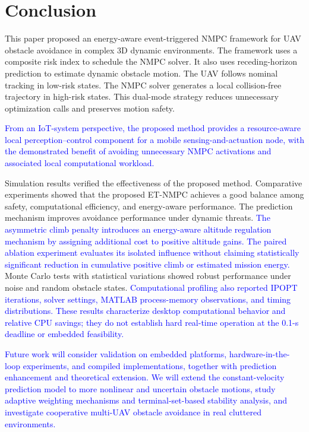 \documentclass[lettersize,journal]{IEEEtran}
\begin{document}
\section{Conclusion}

This paper proposed an energy-aware event-triggered NMPC framework for UAV obstacle avoidance in complex 3D dynamic environments. The framework uses a composite risk index to schedule the NMPC solver. It also uses receding-horizon prediction to estimate dynamic obstacle motion. The UAV follows nominal tracking in low-risk states. The NMPC solver generates a local collision-free trajectory in high-risk states. This dual-mode strategy reduces unnecessary optimization calls and preserves motion safety.

\textcolor{blue}{From an IoT-system perspective, the proposed method provides a resource-aware local perception--control component for a mobile sensing-and-actuation node, with the demonstrated benefit of avoiding unnecessary NMPC activations and associated local computational workload.}

Simulation results verified the effectiveness of the proposed method. Comparative experiments showed that the proposed ET-NMPC achieves a good balance among safety, computational efficiency, and energy-aware performance. The prediction mechanism improves avoidance performance under dynamic threats. \textcolor{blue}{The asymmetric climb penalty introduces an energy-aware altitude regulation mechanism by assigning additional cost to positive altitude gains. The paired ablation experiment evaluates its isolated influence without claiming statistically significant reduction in cumulative positive climb or estimated mission energy.} Monte Carlo tests with statistical variations showed robust performance under noise and random obstacle states. \textcolor{blue}{Computational profiling also reported IPOPT iterations, solver settings, MATLAB process-memory observations, and timing distributions. These results characterize desktop computational behavior and relative CPU savings; they do not establish hard real-time operation at the 0.1-s deadline or embedded feasibility.}

\textcolor{blue}{Future work will consider validation on embedded platforms, hardware-in-the-loop experiments, and compiled implementations, together with prediction enhancement and theoretical extension. We will extend the constant-velocity prediction model to more nonlinear and uncertain obstacle motions, study adaptive weighting mechanisms and terminal-set-based stability analysis, and investigate cooperative multi-UAV obstacle avoidance in real cluttered environments.}
\end{document}
